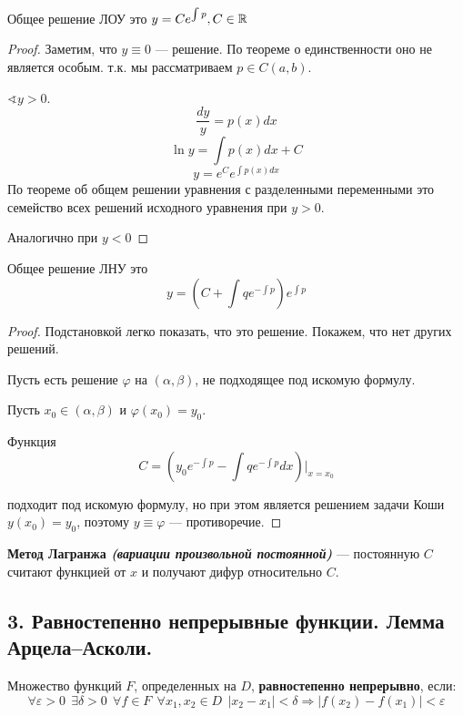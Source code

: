Общее решение ЛОУ это \(y = Ce^{\int p}, C\in\mathbb{R}\)

\begin{proof}
    Заметим, что \(y\equiv 0\) --- решение. По теореме о единственности оно не является особым. т.к. мы рассматриваем \(p\in C(a, b)\).

    \(\sphericalangle y > 0\).
    \[\frac{dy}{y} = p(x)dx\]
    \[\ln y = \int p(x)dx + C\]
    \[y = e^C e^{\int p(x)dx}\]
    По теореме об общем решении уравнения с разделенными переменными это семейство всех решений исходного уравнения при \(y > 0\).

    Аналогично при \(y < 0\)
\end{proof}

Общее решение ЛНУ это
\[y = \left( C + \int qe^{ -\int p} \right)e^{\int p}\]
\begin{proof}
    Подстановкой легко показать, что это решение. Покажем, что нет других решений.

    Пусть есть решение \(\varphi\) на \((\alpha, \beta)\), не подходящее под искомую формулу.

    Пусть \(x_0 \in (\alpha,\beta)\) и \(\varphi(x_0) = y_0\).

    Функция
    \[C = \left( y_0 e^{ -\int p} - \int q e^{ -\int p} dx\right)\Bigg|_{x = x_0}\]

    подходит под искомую формулу, но при этом является решением задачи Коши \(y(x_0) = y_0\), поэтому \(y \equiv \varphi\) --- противоречие.
\end{proof}

\textbf{Метод Лагранжа \textit{(вариации произвольной постоянной)}} --- постоянную \(C\) считают функцией от \(x\) и получают дифур относительно \(C\).

\subsection*{3. Равностепенно непрерывные функции. Лемма Арцела–Асколи.}

Множество функций \(F \), определенных на \(D\), \textbf{равностепенно непрерывно}, если:
\[\forall \varepsilon > 0 \ \ \exists \delta > 0 \ \ \forall f\in F \ \ \forall x_1, x_2\in D \ \ |x_2 - x_1|< \delta \Rightarrow |f(x_2) - f(x_1)|< \varepsilon\]

